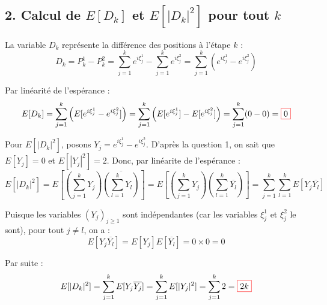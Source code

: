 \documentclass[12pt,a4paper]{report}
\begin{document}
\subsection*{2. Calcul de $E[D_k]$ et $E[|D_k|^2]$ pour tout $k$}
La variable $D_k$ représente la différence des positions à l'étape $k$ :
$$D_k = P^1_k - P^2_k = \sum_{j=1}^k e^{i\xi^1_j} - \sum_{j=1}^k e^{i\xi^2_j} = \sum_{j=1}^k (e^{i\xi^1_j} - e^{i\xi^2_j})$$

Par linéarité de l'espérance :
$$E[D_k] = \sum_{j=1}^k \left( E[e^{i\xi^1_j} - e^{i\xi^2_j}] \right) = \sum_{j=1}^k \left( E[e^{i\xi^1_j}] - E[e^{i\xi^2_j}] \right) = \sum_{j=1}^k (0 - 0) = \fcolorbox{red}{white}{$0$}$$


Pour $E[|D_k|^2]$, posons $Y_j = e^{i\xi^1_j} - e^{i\xi^2_j}$. D'après la question 1, on sait que $E[Y_j] = 0$ et $E[|Y_j|^2] = 2$. Donc, par linéarite de l'espérance : 
\[
E[|D_k|^2]
= E\left[\left(\sum_{j=1}^k Y_j\right)\overline{\left(\sum_{l=1}^k Y_l\right)}\right]
= E\left[\left(\sum_{j=1}^k Y_j\right)\left(\sum_{l=1}^k \overline{Y_l}\right)\right]
= \sum_{j=1}^k \sum_{l=1}^k E[Y_j \overline{Y_l}]
\]

Puisque les variables $(Y_j)_{j \ge 1}$ sont indépendantes (car les variables $\xi^1_j$ et $\xi^2_j$ le sont), pour tout $j \neq l$, on a :
$$E[Y_j \overline{Y_l}] = E[Y_j]E[\overline{Y_l}] = 0 \times 0 = 0$$

Par suite :
$$E[|D_k|^2] = \sum_{j=1}^k E[Y_j \overline{Y_j}] = \sum_{j=1}^k E[|Y_j|^2] = \sum_{j=1}^k 2 = \fcolorbox{red}{white}{$2k$}$$
\end{document}
